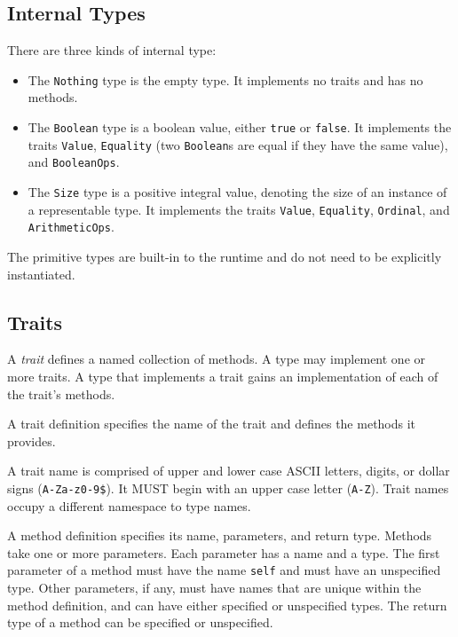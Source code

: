 \documentclass[10pt,twocolumn,a4paper]{article}
\newcommand{\code}[1]{\texttt{#1}}
\begin{document}
\subsection{Internal Types}

There are three kinds of internal type: 
\begin{itemize}
  \item The \code{Nothing} type is the empty type. 
    It implements no traits and has no methods.

  \item The \code{Boolean} type is a boolean value, either \code{true} or
    \code{false}.  It implements the traits \code{Value}, \code{Equality}
    (two \code{Boolean}s are equal if they have the same value), and
    \code{BooleanOps}.

  \item The \code{Size} type is a positive integral value, denoting the
    size of an instance of a representable type. It implements the traits
    \code{Value}, \code{Equality}, \code{Ordinal}, and
    \code{ArithmeticOps}.

\end{itemize}
The primitive types are built-in to the runtime and do not need to be
explicitly instantiated.

\subsection{Traits}
\label{sec:traits}

A \emph{trait} defines a named collection of methods. A type may implement
one or more traits. A type that implements a trait gains an implementation
of each of the trait's methods.

A trait definition specifies the name of the trait and defines the methods
it provides.

A trait name is comprised of upper and lower case ASCII letters, digits, or
dollar signs (\code{A-Za-z0-9\$}).  It MUST begin with an upper case letter
(\code{A-Z}). Trait names occupy a different namespace to type names.

A method definition specifies its name, parameters, and return type.
Methods take one or more parameters.
Each parameter has a name and a type.
The first parameter of a method must have the name \code{self} and must
have an unspecified type.
Other parameters, if any, must have names that are unique within the method
definition, and can have either specified or unspecified types.
The return type of a method can be specified or unspecified.
\end{document}
